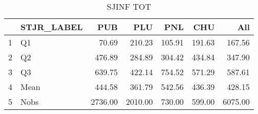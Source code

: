 \begin{table}[ht]
\centering
\begin{tabular}{rlrrrrr}
  \hline
 & STJR\_LABEL & PUB & PLU & PNL & CHU & All \\ 
  \hline
1 & Q1 & 70.69 & 210.23 & 105.91 & 191.63 & 167.56 \\ 
  2 & Q2 & 476.89 & 284.89 & 304.42 & 434.84 & 347.90 \\ 
  3 & Q3 & 639.75 & 422.14 & 754.52 & 571.29 & 587.61 \\ 
  4 & Mean & 444.58 & 361.79 & 542.56 & 436.39 & 428.15 \\ 
  5 & Nobs & 2736.00 & 2010.00 & 730.00 & 599.00 & 6075.00 \\ 
   \hline
\end{tabular}
\caption{SJINF TOT} 
\end{table}

